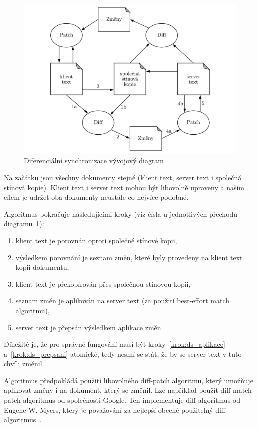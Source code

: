\begin{figure}[ht]
    \centering
    \includegraphics[width=\textwidth]{partials/analyza/DS_diagram.pdf}
    \caption{Diferenciální synchronizace vývojový diagram~\cite{ds:neil_paper}}\label{fig:DS_diagram}
\end{figure}

Na začátku jsou všechny dokumenty stejné (klient text, server text i společná stínová kopie).
Klient text i server text mohou být libovolně upraveny a naším cílem je udržet oba dokumenty neustále co nejvíce podobné.

Algoritmus pokračuje následujícími kroky (viz čísla u jednotlivých přechodů diagramu~\ref{fig:DS_diagram}):
\begin{enumerate}
    \item klient text je porovnán oproti společné stínové kopii,
    \item výsledkem porovnání je seznam změn, které byly provedeny na klient text kopii dokumentu,
    \item klient text je překopírován přes společnou stínovou kopii,
    \item seznam změn je aplikován na server text (za použití best-effort match algoritmu),\label{krok:ds_aplikace}
    \item server text je přepsán výsledkem aplikace změn.\label{krok:ds_prepsani}
\end{enumerate}

Důležité je, že pro správné fungování musí být kroky~\ref{krok:ds_aplikace} a~\ref{krok:ds_prepsani} atomické, tedy nesmí se stát, že by se server text v tuto chvíli změnil.

Algoritmus předpokládá použití libovolného diff-patch algoritmu, který umožňuje aplikovat změny i na dokument, který se změnil.
Lze například použít diff-match-patch algoritmus od společnosti Google.
Ten implementuje diff algoritmus od Eugene W. Myers, který je považování za nejlepší obecně použitelný diff algoritmus~\cite{ds:myers_diff}.~\cite{ds:neil_paper}~\cite{ds:neil_video}

